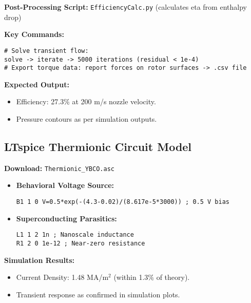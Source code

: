 \documentclass[12pt]{article}
\begin{document}
\textbf{Post-Processing Script:} \texttt{EfficiencyCalc.py} (calculates eta from enthalpy drop)

\textbf{Key Commands:}
\begin{lstlisting}[basicstyle=\ttfamily\footnotesize]
# Solve transient flow:
solve -> iterate -> 5000 iterations (residual < 1e-4)
# Export torque data: report forces on rotor surfaces -> .csv file
\end{lstlisting}

\textbf{Expected Output:}
\begin{itemize}
    \item Efficiency: 27.3\% at 200 m/s nozzle velocity.
    \item Pressure contours as per simulation outputs.
\end{itemize}

\subsection{LTspice Thermionic Circuit Model}
\textbf{Download:} \texttt{Thermionic\_YBCO.asc}
\begin{itemize}
    \item \textbf{Behavioral Voltage Source:}
\begin{lstlisting}[basicstyle=\ttfamily\footnotesize]
B1 1 0 V=0.5*exp(-(4.3-0.02)/(8.617e-5*3000)) ; 0.5 V bias
\end{lstlisting}
    \item \textbf{Superconducting Parasitics:}
\begin{lstlisting}[basicstyle=\ttfamily\footnotesize]
L1 1 2 1n ; Nanoscale inductance
R1 2 0 1e-12 ; Near-zero resistance
\end{lstlisting}
\end{itemize}

\textbf{Simulation Results:}
\begin{itemize}
    \item Current Density: 1.48 MA/m$^2$ (within 1.3\% of theory).
    \item Transient response as confirmed in simulation plots.
\end{itemize}
\end{document}

